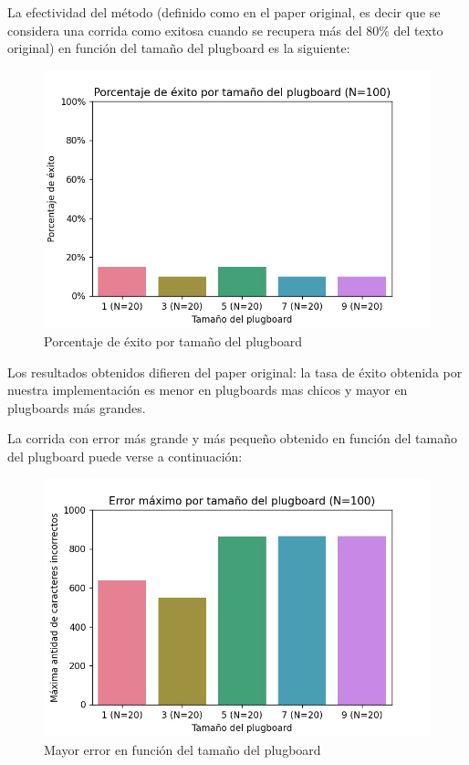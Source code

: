 \documentclass[a4paper,10pt]{article}
\begin{document}
La efectividad del método (definido como en el paper original, es decir que se considera una corrida como exitosa cuando se recupera más del 80\% del texto original) en función del tamaño del plugboard es la siguiente:

\begin{figure}[H]
    \centering
    \includegraphics[scale=0.8]{success.jpg}
    \caption{Porcentaje de éxito por tamaño del plugboard}
    \label{fig:my_label}
\end{figure}

Los resultados obtenidos difieren del paper original: la tasa de éxito obtenida por nuestra implementación es menor en plugboards mas chicos y mayor en plugboards más grandes.

La corrida con error más grande y más pequeño obtenido en función del tamaño del plugboard puede verse a continuación:

\begin{figure}[H]
    \centering
    \includegraphics[scale=0.8]{max_error.jpg}
    \caption{Mayor error en función del tamaño del plugboard}
    \label{fig:my_label}
\end{figure}
\end{document}
